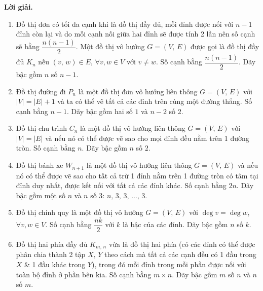 \documentclass[a4paper, 11pt]{article}
\theoremstyle{definition}
\begin{document}
	\textbf{Lời giải. }

	\begin{enumerate}[label=(\alph*)]
		\item Đồ thị đơn có tối đa cạnh khi là đồ thị đầy đủ, mỗi đỉnh được nối với $n-1$ đỉnh còn lại và do mỗi cạnh nối giữa hai đỉnh sẽ được tính 2 lần nên số cạnh sẽ bằng $\dfrac{n(n-1)}{2}$. Một đồ thị vô hướng $G = (V,\,E)$ được gọi là đồ thị đầy đủ $K_n$ nếu $(v,\,w)\in E$, $\forall v,w\in V$ với $v\ne w$. Số cạnh bằng $\dfrac{n(n-1)}{2}$. Dãy bậc gồm $n$ số $n-1$.
		\item Đồ thị đường đi $P_n$ là một đồ thị đơn vô hướng liên thông $G = (V,\,E)$ với $|V| = |E| + 1$ và ta có thể vẽ tất cả các đỉnh trên cùng một đường thẳng. Số cạnh bằng $n-1$. Dãy bậc gồm hai số $1$ và $n-2$ số 2.
		\item Đồ thị chu trình $C_n$ là một đồ thị vô hướng liên thông $G = (V,\,E)$ với $|V| = |E|$ và nếu nó có thể được vẽ sao cho mọi đỉnh đều nằm trên 1 đường tròn. Số cạnh bằng $n$. Dãy bậc gồm $n$ số $2$.
		\item Đồ thị bánh xe $W_{n+1}$ là một đồ thị vô hướng liên thông $G = (V,\,E)$ và nếu nó có thể được vẽ sao cho tất cả trừ 1 đỉnh nằm trên 1 đường tròn có tâm tại đỉnh duy nhất, được kết nối với tất cả các đỉnh khác. Số cạnh bằng $2n$. Dãy bậc gồm một số $n$ và $n$ số 3: $n,\,3,\,3,\,\ldots,\,3$.
		\item Đồ thị chính quy là một đồ thị vô hướng $G = (V,\,E)$ với $\deg v = \deg w$, $\forall v,w\in V$. Số cạnh bằng $\dfrac{nk}{2}$ với $k$ là bậc của các đỉnh. Dãy bậc gồm $n$ số $k$.
		\item Đồ thị hai phía đầy đủ $K_{m,\,n}$ vừa là đồ thị hai phía (có các đỉnh có thể được phân chia thành 2 tập $X,\,Y$ theo cách mà tất cả các cạnh đều có 1 đầu trong $X$ \& 1 đầu khác trong $Y$), trong đó mỗi đỉnh trong mỗi phần được nối với toàn bộ đỉnh ở phần bên kia. Số cạnh bằng $m \times n$. Dãy bậc gồm $m$ số $n$ và $n$ số $m$.
	\end{enumerate}

	

\end{document}
